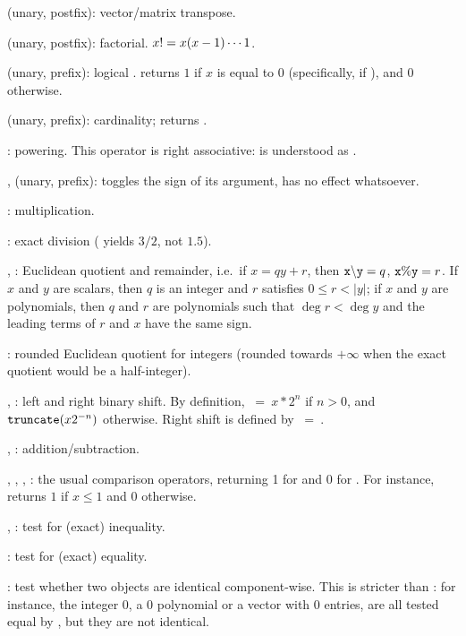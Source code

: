 \strut\kbd{\til} (unary, postfix): vector/matrix transpose.

\kbd{!} (unary, postfix): factorial. $x{\tt !}=x(x-1)\cdots 1$.

\kbd{!} (unary, prefix): logical .  returns $1$ if $x$ is
equal to $0$ (specifically, if ), and $0$ otherwise.

%
\kbd{\#} (unary, prefix): cardinality;  returns .

%
\kbd{\pow}: powering. This operator is right associative:
 is understood as .

%
\kbd{+}, \kbd{-} (unary, prefix): \kbd{-} toggles the sign of its argument,
\kbd{+} has no effect whatsoever.

%
\kbd{*}: multiplication.

\kbd{/}: exact division ( yields $3/2$, not $1.5$).

\kbd{\bs}, \kbd{\%}: Euclidean quotient and remainder, i.e.~if $x =
qy + r$, then $\kbd{x \b{ } y} = q$, ${\tt x\%y} = r$. If $x$ and $y$
are scalars, then $q$ is an integer and $r$ satisfies $0\le r < |y|$; if $x$
and $y$ are polynomials, then $q$ and $r$ are polynomials such that $\deg r<
\deg y$ and the leading terms of $r$ and $x$ have the same sign.

\kbd{\bs/}: rounded Euclidean quotient for integers (rounded towards
$+\infty$ when the exact quotient would be a half-integer).

\kbd{<<}, \kbd{>>}: left and right binary shift. By definition,
$~=~x * 2^n$ if $n>0$, and ${\tt truncate}(x 2^{-n})$ otherwise.
Right shift is defined by $~=~$.

%
\kbd{+}, \kbd{-}: addition/subtraction.

%
\kbd{<}, \kbd{>}, \kbd{<=}, \kbd{>=}: the usual comparison operators,
returning 1 for  and 0 for . For instance,
 returns $1$ if $x\le 1$ and $0$ otherwise.

\kbd{<>}, \kbd{!=}: test for (exact) inequality.

\kbd{==}: test for (exact) equality.

\kbd{===}: test whether two objects are identical component-wise. This is
stricter than \kbd{==}: for instance, the integer 0, a 0 polynomial or a
vector with 0 entries, are all tested equal by \kbd{==}, but they are not
identical.

